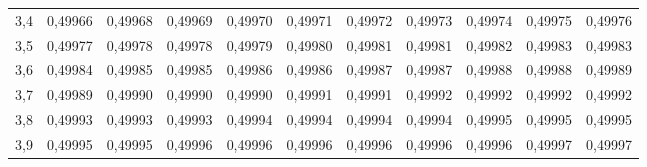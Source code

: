 \documentclass[14pt,aspectratio=1610]{beamer}
\begin{document}
\begin{frame}[fragile]{}
\begin{block}{}
\begin{center}
{\begin{tabular}{rrrrrrrrrrr}
  3,4 & 0,49966 & 0,49968 & 0,49969 & 0,49970 & 0,49971 & 0,49972 & 0,49973 & 0,49974 & 0,49975 & 0,49976 \\ 
  3,5 & 0,49977 & 0,49978 & 0,49978 & 0,49979 & 0,49980 & 0,49981 & 0,49981 & 0,49982 & 0,49983 & 0,49983 \\ 
  3,6 & 0,49984 & 0,49985 & 0,49985 & 0,49986 & 0,49986 & 0,49987 & 0,49987 & 0,49988 & 0,49988 & 0,49989 \\ 
  3,7 & 0,49989 & 0,49990 & 0,49990 & 0,49990 & 0,49991 & 0,49991 & 0,49992 & 0,49992 & 0,49992 & 0,49992 \\ 
  3,8 & 0,49993 & 0,49993 & 0,49993 & 0,49994 & 0,49994 & 0,49994 & 0,49994 & 0,49995 & 0,49995 & 0,49995 \\ 
  3,9 & 0,49995 & 0,49995 & 0,49996 & 0,49996 & 0,49996 & 0,49996 & 0,49996 & 0,49996 & 0,49997 & 0,49997 \\ 
   \hline
\end{tabular}}
\end{center}
\end{block}
\end{frame}
\end{document}
